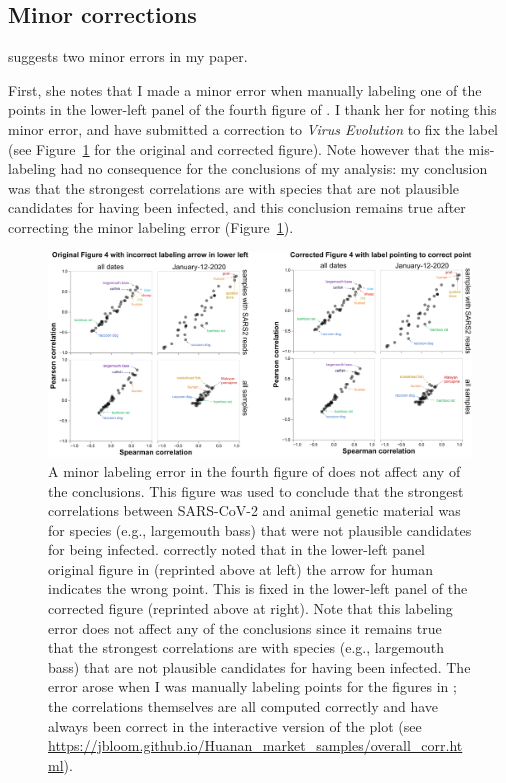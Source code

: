 \documentclass[9pt,twocolumn,twoside]{gsajnl_modified}
\begin{document}
\subsection{Minor corrections}
\citet{debarre2024what} suggests two minor errors in my paper.

First, she notes that I made a minor error when manually labeling one of the points in the lower-left panel of the fourth figure of \citet{bloom2023association}.
I thank her for noting this minor error, and have submitted a correction to \textit{Virus Evolution} to fix the label (see Figure~\ref{fig:correction} for the original and corrected figure).
Note however that the mis-labeling had no consequence for the conclusions of my analysis: my conclusion was that the strongest correlations are with species that are not plausible candidates for having been infected, and this conclusion remains true after correcting the minor labeling error (Figure~\ref{fig:correction}).

\begin{figure}
\centerline{\includegraphics[width=0.7\linewidth]{figures/original_vs_corrected_fig4.png}}
\caption{
A minor labeling error in the fourth figure of \citet{bloom2023association} does not affect any of the conclusions.
This figure was used to conclude that the strongest correlations between SARS-CoV-2 and animal genetic material was for species (e.g., largemouth bass) that were not plausible candidates for being infected.
\citet{debarre2024what} correctly noted that in the lower-left panel original figure in \citet{bloom2023association} (reprinted above at left) the arrow for human indicates the wrong point.
This is fixed in the lower-left panel of the corrected figure (reprinted above at right).
Note that this labeling error does not affect any of the conclusions since it remains true that the strongest correlations are with species (e.g., largemouth bass) that are not plausible candidates for having been infected.
The error arose when I was manually labeling points for the figures in \citet{bloom2023association}; the correlations themselves are all computed correctly and have always been correct in the interactive version of the plot (see \url{https://jbloom.github.io/Huanan_market_samples/overall_corr.html}).
\label{fig:correction}
}
\end{figure}
\end{document}
